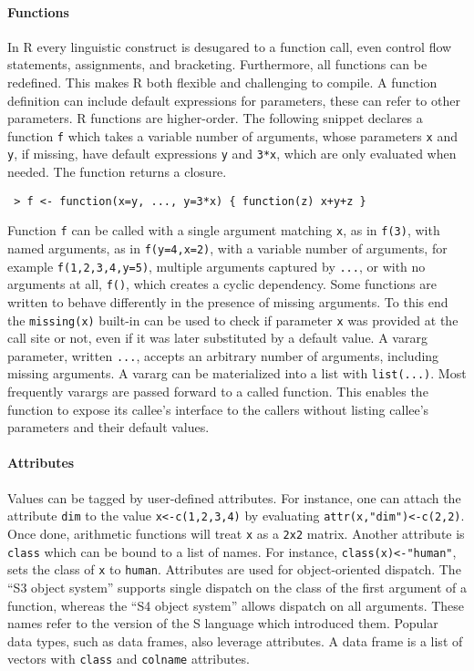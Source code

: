 \documentclass[review,nonacm,screen,acmsmall,anonymous=true]{acmart}
\newcommand{\code}[1]{\lstinline |#1|\xspace}
\renewcommand{\c}[1]{\lstinline |#1|\xspace}
\begin{document}
\paragraph{Functions}
In R every linguistic construct is desugared to a function call, even control
flow statements, assignments, and bracketing. Furthermore, all functions can be
redefined. This makes R both flexible and challenging to compile. A function
definition can include default expressions for parameters, these can refer to
other parameters. R functions are higher-order. The following snippet declares a
function \code f which takes a variable number of arguments, whose parameters
\code x and \code y, if missing, have default expressions \code y and
\code{3*x}, which are only evaluated when needed. The function returns a closure.
\begin{lstlisting}
 > f <- function(x=y, ..., y=3*x) { function(z) x+y+z }
\end{lstlisting}\vspace{1mm}
\noindent
Function \code f can be called with a single argument matching \code x, as in
\code{f(3)}, with named arguments, as in \code{f(y=4,x=2)}, with a variable
number of arguments, for example \code{f(1,2,3,4,y=5)}, multiple arguments
captured by \code{...}, or with no arguments at all, \code{f()}, which creates a
cyclic dependency. Some functions are written to behave differently in the
presence of missing arguments. To this end the \c{missing(x)} built-in can be
used to check if parameter \code{x} was provided at the call site or not, even
if it was later substituted by a default value. A vararg parameter, written
\code{...}, accepts an arbitrary number of arguments, including missing
arguments. A vararg can be materialized into a list with \code{list(...)}. Most
frequently varargs are passed forward to a called function. This enables the
function to expose its callee's interface to the callers without listing
callee's parameters and their default values.

\paragraph{Attributes}
Values can be tagged by user-defined attributes. For instance, one can attach
the attribute \code{dim} to the value \code{x<-c(1,2,3,4)} by evaluating
\code{attr(x,"dim")<-c(2,2)}. Once done, arithmetic functions will treat \code x
as a \code{2x2} matrix. Another attribute is \code{class} which can be bound to
a list of names. For instance, \code{class(x)<-"human"}, sets the class of
\code{x} to \code{human}. Attributes are used for object-oriented dispatch. The
``S3 object system'' supports single dispatch on the class of the first argument
of a function, whereas the ``S4 object system'' allows dispatch on all
arguments. These names refer to the version of the S language which introduced
them. Popular data types, such as data frames, also leverage attributes. A data
frame is a list of vectors with \code{class} and \code{colname} attributes.
\end{document}
